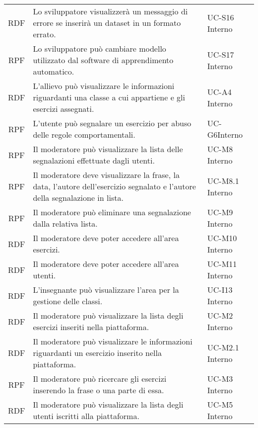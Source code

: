 \begin{tabularx}{\textwidth}{| c | p{10cm} | X |}
		RDF & Lo sviluppatore visualizzerà un messaggio di errore se inserirà un dataset in un formato errato. & UC-S16 \newline Interno\\
		RPF & Lo sviluppatore può cambiare modello utilizzato dal software di apprendimento automatico. & UC-S17 \newline Interno\\
		RDF & L'allievo può visualizzare le informazioni riguardanti una classe a cui appartiene e gli esercizi assegnati. & UC-A4 \newline Interno\\
		RPF & L'utente può segnalare un esercizio per abuso delle regole comportamentali. & UC-G6\newline Interno\\
		RPF & Il moderatore può visualizzare la lista delle segnalazioni effettuate dagli utenti. & UC-M8 \newline Interno\\
		RPF & Il moderatore deve visualizzare la frase, la data, l'autore dell'esercizio segnalato e l'autore della segnalazione in lista. & UC-M8.1 \newline Interno\\
		RPF & Il moderatore può eliminare una segnalazione dalla relativa lista. & UC-M9 \newline Interno\\
		RDF & Il moderatore deve poter accedere all'area esercizi. & UC-M10 \newline Interno\\
		RDF & Il moderatore deve poter accedere all'area utenti. & UC-M11 \newline Interno\\
		RDF & L'insegnante può visualizzare l'area per la gestione delle classi. & UC-I13 \newline Interno\\
		RDF & Il moderatore può visualizzare la lista degli esercizi inseriti nella piattaforma. & UC-M2 \newline Interno\\
		RDF & Il moderatore può visualizzare le informazioni riguardanti un esercizio inserito nella piattaforma. & UC-M2.1 \newline Interno\\
		RPF & Il moderatore può ricercare gli esercizi inserendo la frase o una parte di essa. & UC-M3 \newline Interno\\
		RDF & Il moderatore può visualizzare la lista degli utenti iscritti alla piattaforma. & UC-M5 \newline Interno\\

\end{tabularx}
